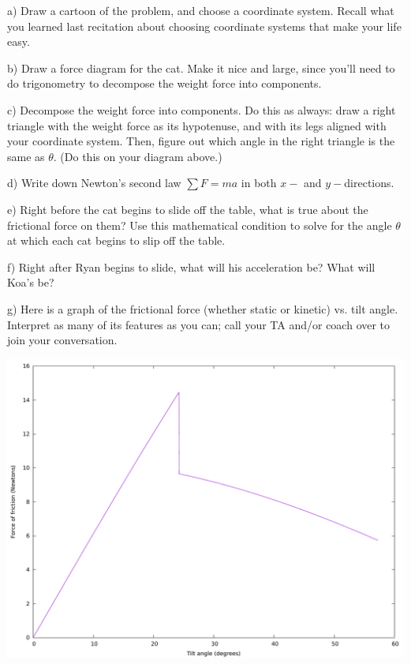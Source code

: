 \documentclass[12pt]{article}
\begin{document}
a) Draw a cartoon of the problem, and choose a coordinate system. Recall what you learned last recitation about choosing
coordinate systems that make your life easy.

\vspace{2in}
\newpage

b) Draw a force diagram for the cat. Make it nice and large, since you'll need to do trigonometry to decompose the 
weight force into components.

\vspace{3in}


c) Decompose the weight force into components. Do this as always: draw a right triangle with the weight force as its 
hypotenuse, and with its legs aligned with your coordinate system. Then, figure out which angle in the right triangle
is the same as $\theta$. (Do this on your diagram above.)

d) Write down Newton's second law $\sum F = ma$ in both $x-$ and $y-$directions. 

\vspace{2in}

e) Right before the cat begins to slide off the table, what is true about the frictional force on them? Use this 
mathematical condition to solve for the angle $\theta$ at which each cat begins to slip off the table.

\vspace{2in}
\newpage
f) Right after Ryan begins to slide, what will his acceleration be? What will Koa's be?

\vspace{3in}

g) Here is a graph of the frictional force (whether static or kinetic) vs. tilt angle. Interpret as many of its features as you
can; call your TA and/or coach over to join your conversation.

\begin{center}
\includegraphics[width=.9\textwidth]{tilt.pdf}
\end{center}
\end{document}
